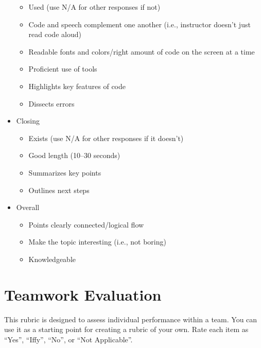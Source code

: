 \begin{itemize}
  \begin{itemize}
  \item
    Used (use N/A for other responses if not)
  \item
    Code and speech complement one another (i.e., instructor doesn't just read code aloud)
  \item
    Readable fonts and colors/right amount of code on the screen at a time
  \item
    Proficient use of tools
  \item
    Highlights key features of code
  \item
    Dissects errors
  \end{itemize}
\item
  Closing

  \begin{itemize}
  \item
    Exists (use N/A for other responses if it doesn't)
  \item
    Good length (10--30 seconds)
  \item
    Summarizes key points
  \item
    Outlines next steps
  \end{itemize}
\item
  Overall

  \begin{itemize}
  \item
    Points clearly connected/logical flow
  \item
    Make the topic interesting (i.e., not boring)
  \item
    Knowledgeable
  \end{itemize}
\end{itemize}

\section{Teamwork Evaluation}\label{s:checklists-teameval}

This rubric is designed to assess individual performance within a
team. You can use it as a starting point for creating a rubric of
your own. Rate each item as ``Yes'', ``Iffy'', ``No'', or ``Not Applicable''.

